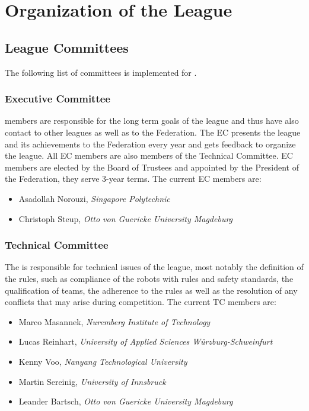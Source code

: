 \section{Organization of the League}
\label{sec:organisation_of_the_league}

\subsection{League Committees}
The following list of committees is implemented for \RCAW.

\subsubsection{Executive Committee}

 members are responsible for the long term goals of the league and thus have also contact to other leagues as well as to the \RC Federation. The EC presents the league and its achievements to the \RC Federation every year and gets feedback to organize the league. All EC members are also members of the Technical Committee. EC members are elected by the Board of Trustees and appointed by the President of the \RC Federation, they serve 3-year terms. The current EC members are:

\begin{itemize}
	\item Asadollah Norouzi, \textit{Singapore Polytechnic}
    \item Christoph Steup, \textit{Otto von Guericke University Magdeburg}
\end{itemize}

\subsubsection{Technical Committee}
The  is responsible for technical issues of the league, most notably the definition of the rules, such as compliance of the robots with rules and safety standards, the qualification of teams, the adherence to the rules as well as the resolution of any conflicts that may arise during competition. The current TC members are:

\begin{itemize}
	\item Marco Masannek, \textit{Nuremberg Institute of Technology}
	\item Lucas Reinhart, \textit{University of Applied Sciences W{\"u}rzburg-Schweinfurt}
	\item Kenny Voo, \textit{Nanyang Technological University} 
	\item Martin Sereinig, \textit{University of Innsbruck} 
	\item Leander Bartsch, \textit{Otto von Guericke University Magdeburg} 
\end{itemize}

